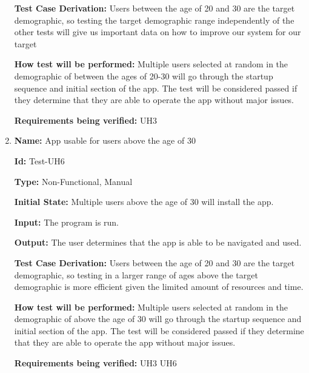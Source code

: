 \documentclass[12pt, titlepage]{article}
\begin{document}
\begin{enumerate}
\textbf{Test Case Derivation:} Users between the age of 20 and 30 are the target demographic, so testing the target demographic range independently of the other tests will give us important data on how to improve our system for our target 
					
\textbf{How test will be performed:} Multiple users selected at random in the demographic of between the ages of 20-30 will go through the startup sequence and initial section of the app. The test will be considered passed if they determine that they are able to operate the app without major issues. 

\textbf{Requirements being verified:} UH3

\item{\textbf{Name:} App usable for users above the age of 30} \label{itm:Test-UH6}

\textbf{Id:} Test-UH6

\textbf{Type:} Non-Functional, Manual
					
\textbf{Initial State:} Multiple users above the age of 30 will install the app.
					
\textbf{Input:} The program is run.
					
\textbf{Output:} The user determines that the app is able to be navigated and used.

\textbf{Test Case Derivation:} Users between the age of 20 and 30 are the target demographic, so testing in a larger range of ages above the target demographic is more efficient given the limited amount of resources and time.
					
\textbf{How test will be performed:} Multiple users selected at random in the demographic of above the age of 30 will go through the startup sequence and initial section of the app. The test will be considered passed if they determine that they are able to operate the app without major issues. 

\textbf{Requirements being verified:} UH3 UH6



					
					
					

\end{enumerate}
\end{document}
